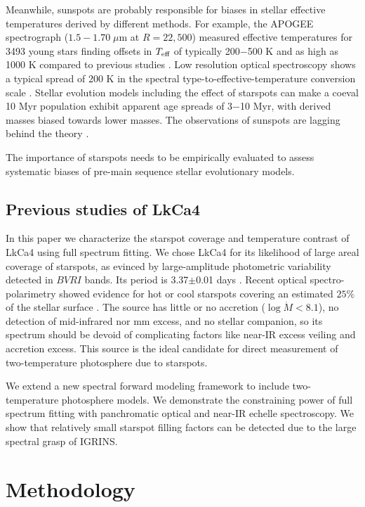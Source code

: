 \documentclass[onecolumn]{emulateapj}%
\newcommand{\name}{LkCa4 }
\begin{document}
Meanwhile, sunspots are probably responsible for biases in stellar effective temperatures derived by different methods.  For example, the APOGEE spectrograph ($1.5-1.70 \;\mu$m at $R=22,500$) measured effective temperatures for 3493 young stars finding offsets in $T_\textrm{eff}$ of typically 200$-$500 K and as high as 1000 K compared to previous studies \citep{2014ApJ...794..125C}.  Low resolution optical spectroscopy shows a typical spread of 200 K in the spectral type-to-effective-temperature conversion scale \citep{2014ApJ...786...97H}.  Stellar evolution models including the effect of starspots can make a coeval 10 Myr population exhibit apparent age spreads of 3$-$10 Myr, with derived masses biased towards lower masses.  The observations of sunspots are lagging behind the theory \citep{2015ApJ...807..174S}.

The importance of starspots needs to be empirically evaluated to assess systematic biases of pre-main sequence stellar evolutionary models.

\subsection{Previous studies of \name}

In this paper we characterize the starspot coverage and temperature contrast of \name using full spectrum fitting.  We chose \name for its likelihood of large areal coverage of starspots, as evinced by large-amplitude photometric variability  detected in $BVRI$ bands.  Its period is 3.37$\pm$0.01 days \citep{1993AJ....106.1608V,1994IBVS.4042....1G}.  Recent optical spectro-polarimetry showed evidence for hot or cool starspots covering an estimated $25\%$ of the stellar surface \citep{2014MNRAS.444.3220D}.  The source has little or no accretion ($\log{\dot M} < 8.1$), no detection of mid-infrared nor mm excess, and no stellar companion, so its spectrum should be devoid of complicating factors like near-IR excess veiling and accretion excess.  This source is the ideal candidate for direct measurement of two-temperature photosphere due to starspots.

We extend a new spectral forward modeling framework to include two-temperature photosphere models.  We demonstrate the constraining power of full spectrum fitting with panchromatic optical and near-IR echelle spectroscopy.  We show that relatively small starspot filling factors can be detected due to the large spectral grasp of IGRINS.  

\section{Methodology}\label{sec:methods} 
\end{document}
